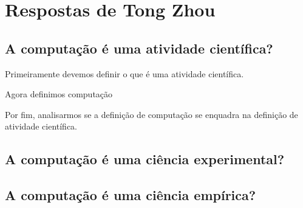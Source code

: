 \section{Respostas de Tong Zhou}

\subsection{A computação é uma atividade científica?}

Primeiramente devemos definir o que é uma atividade científica. 

Agora definimos computação

   
Por fim, analisarmos se a definição de computação se enquadra na definição de atividade científica. 

\subsection{A computação é uma ciência experimental?}

\subsection{A computação é uma ciência empírica?}
